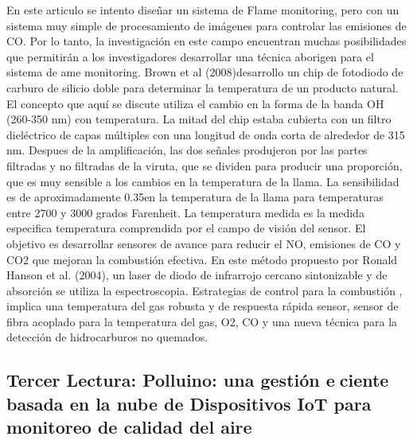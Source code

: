\documentclass[10pt,a4paper]{article}
\begin{document}
\begin{multicols}{2}
\begin{itemize}
En este articulo se intento diseñar un sistema de
Flame monitoring, pero con un sistema muy simple de
procesamiento de imágenes para controlar las emisiones
de CO. Por lo tanto, la investigación en este campo
encuentran muchas posibilidades que permitirán a los
investigadores desarrollar una técnica aborigen para el
sistema de ame monitoring.
Brown et al (2008)desarrollo un chip de fotodiodo
de carburo de silicio doble para determinar la temperatura
de un producto natural. El concepto que aquí se
discute utiliza el cambio en la forma de la banda OH
(260-350 nm) con temperatura. La mitad del chip estaba
cubierta con un filtro dieléctrico de capas múltiples
con una longitud de onda corta de alrededor de 315 nm.
Despues de la amplificación, las dos señales produjeron
por las partes filtradas y no filtradas de la viruta, que
se dividen para producir una proporción, que es muy
sensible a los cambios en la temperatura de la llama. La
sensibilidad es de aproximadamente 0.35en la temperatura
de la llama para temperaturas entre 2700 y 3000
grados Farenheit. La temperatura medida es la medida
especifica temperatura comprendida por el campo de
visión del sensor.
El objetivo es desarrollar sensores de avance para
reducir el NO, emisiones de CO y CO2 que mejoran
la combustión efectiva. En este método propuesto por
Ronald Hanson et al. (2004), un laser de diodo de infrarrojo
cercano sintonizable y de absorción se utiliza
la espectroscopia. Estrategias de control para la combustión
, implica una temperatura del gas robusta y de
respuesta rápida sensor, sensor de fibra acoplado para
la temperatura del gas, O2, CO y una nueva técnica
para la detección de hidrocarburos no quemados.

\subsection{Tercer Lectura: Polluino: una gestión eciente basada en la nube de Dispositivos IoT para monitoreo de calidad del aire}


\end{itemize}
\end{multicols}
\end{document}
